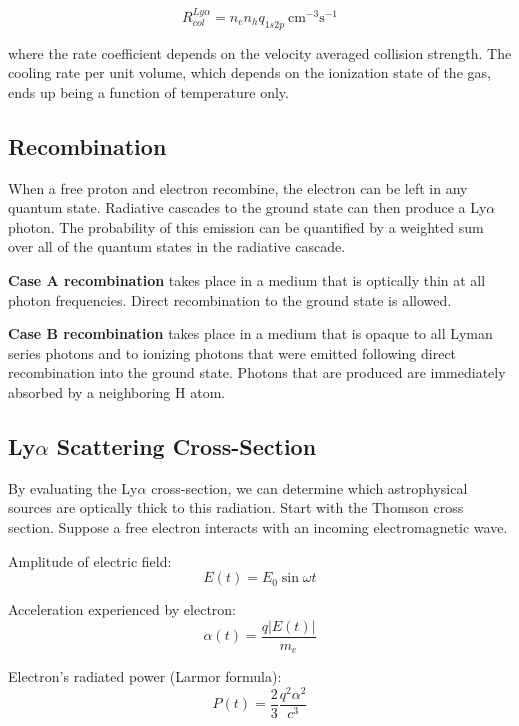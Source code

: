 \documentclass[onecolumn]{aastex63}
\begin{document}
\begin{equation}
    R_{col}^{Ly\alpha} = n_e n_h q_{1s2p}\ \textrm{cm}^{-3} \textrm{s}^{-1}
\end{equation}

where the rate coefficient depends on the velocity averaged collision strength. The cooling rate per unit volume, which depends on the ionization state of the gas, ends up being a function of temperature only.

\subsection{Recombination} When a free proton and electron recombine, the electron can be left in any quantum state. Radiative cascades to the ground state can then produce a Ly$\alpha$ photon. The probability of this emission can be quantified by a weighted sum over all of the quantum states in the radiative cascade.

\textbf{Case A recombination} takes place in a medium that is optically thin at all photon frequencies. Direct recombination to the ground state is allowed.

\textbf{Case B recombination} takes place in a medium that is opaque to all Lyman series photons and to ionizing photons that were emitted following direct recombination into the ground state. Photons that are produced are immediately absorbed by a neighboring H atom.

\subsection{Ly$\alpha$ Scattering Cross-Section}

By evaluating the Ly$\alpha$ cross-section, we can determine which astrophysical sources are optically thick to this radiation. Start with the Thomson cross section. Suppose a free electron interacts with an incoming electromagnetic wave. 

\noindent Amplitude of electric field:
\begin{equation}
    E(t) = E_0 \sin{\omega t}
\end{equation}

\noindent Acceleration experienced by electron:
\begin{equation}
    \alpha(t) = \frac{q|E(t)|}{m_e}
\end{equation}

\noindent Electron's radiated power (Larmor formula):
\begin{equation}
    P(t) = \frac{2}{3}\frac{q^2\alpha^2}{c^3}
\end{equation}
\end{document}
